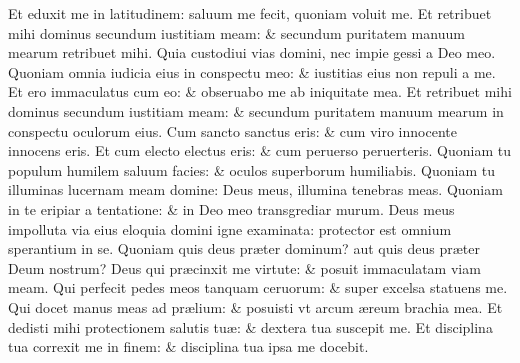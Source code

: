 \documentclass[a5paper,10pt]{book}
\def\ae{æ}
\begin{document}
\begin{multicols*}{2}
\newline \color{red} E\color{black}t eduxit me in latitudinem: saluum me fecit, quoniam voluit me.
\newline \color{red} E\color{black}t retribuet mihi dominus secundum iustitiam meam: \& secundum puritatem manuum mearum retribuet mihi.
\newline \color{red} Q\color{black}uia custodiui vias domini, nec impie gessi a Deo meo.
\newline \color{red} Q\color{black}uoniam omnia iudicia eius in conspectu meo: \& iustitias eius non repuli a me.
\newline \color{red} E\color{black}t ero immaculatus cum eo: \& obseruabo me ab iniquitate mea.
\newline \color{red} E\color{black}t retribuet mihi dominus secundum iustitiam meam: \& secundum puritatem manuum mearum in conspectu oculorum eius.
\newline \color{red} C\color{black}um sancto sanctus eris: \& cum viro innocente innocens eris.
\newline \color{red} E\color{black}t cum electo electus eris: \& cum peruerso peruerteris.
\newline \color{red} Q\color{black}uoniam tu populum humilem saluum facies: \& oculos superborum humiliabis.
\newline \color{red} Q\color{black}uoniam tu illuminas lucernam meam domine: Deus meus, illumina tenebras meas.
\newline \color{red} Q\color{black}uoniam in te eripiar a tentatione: \& in Deo meo transgrediar murum.
\newline \color{red} D\color{black}eus meus impolluta via eius eloquia domini igne examinata: protector est omnium sperantium in se.
\newline \color{red} Q\color{black}uoniam quis deus pr\ae ter dominum? aut quis deus pr\ae ter Deum nostrum?
\newline \color{red} D\color{black}eus qui pr\ae cinxit me virtute: \& posuit immaculatam viam meam.
\newline \color{red} Q\color{black}ui perfecit pedes meos tanquam ceruorum: \& super excelsa statuens me.
\newline \color{red} Q\color{black}ui docet manus meas ad pr\ae lium: \& posuisti vt arcum \ae reum brachia mea.
\newline \color{red} E\color{black}t dedisti mihi protectionem salutis tu\ae : \& dextera tua suscepit me.
\newline \color{red} E\color{black}t disciplina tua correxit me in finem: \& disciplina tua ipsa me docebit.

\end{multicols*}
\end{document}
